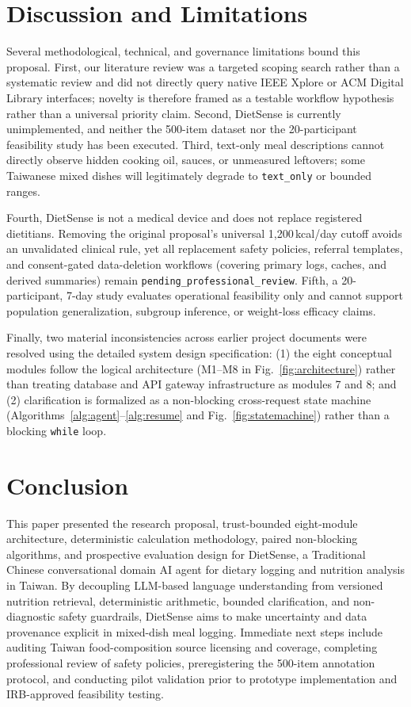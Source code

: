 \documentclass[conference]{IEEEtran}
\begin{document}
\section{Discussion and Limitations}
Several methodological, technical, and governance limitations bound this proposal. First, our literature review was a targeted scoping search rather than a systematic review and did not directly query native IEEE Xplore or ACM Digital Library interfaces; novelty is therefore framed as a testable workflow hypothesis rather than a universal priority claim. Second, DietSense is currently unimplemented, and neither the 500-item dataset nor the 20-participant feasibility study has been executed. Third, text-only meal descriptions cannot directly observe hidden cooking oil, sauces, or unmeasured leftovers; some Taiwanese mixed dishes will legitimately degrade to \texttt{text\_only} or bounded ranges.

Fourth, DietSense is not a medical device and does not replace registered dietitians. Removing the original proposal's universal 1,200\,kcal/day cutoff avoids an unvalidated clinical rule, yet all replacement safety policies, referral templates, and consent-gated data-deletion workflows (covering primary logs, caches, and derived summaries) remain \texttt{pending\_professional\_review}. Fifth, a 20-participant, 7-day study evaluates operational feasibility only and cannot support population generalization, subgroup inference, or weight-loss efficacy claims.

Finally, two material inconsistencies across earlier project documents were resolved using the detailed system design specification: (1) the eight conceptual modules follow the logical architecture (M1--M8 in Fig.~\ref{fig:architecture}) rather than treating database and API gateway infrastructure as modules 7 and 8; and (2) clarification is formalized as a non-blocking cross-request state machine (Algorithms~\ref{alg:agent}--\ref{alg:resume} and Fig.~\ref{fig:statemachine}) rather than a blocking \texttt{while} loop.

\section{Conclusion}
This paper presented the research proposal, trust-bounded eight-module architecture, deterministic calculation methodology, paired non-blocking algorithms, and prospective evaluation design for DietSense, a Traditional Chinese conversational domain AI agent for dietary logging and nutrition analysis in Taiwan. By decoupling LLM-based language understanding from versioned nutrition retrieval, deterministic arithmetic, bounded clarification, and non-diagnostic safety guardrails, DietSense aims to make uncertainty and data provenance explicit in mixed-dish meal logging. Immediate next steps include auditing Taiwan food-composition source licensing and coverage, completing professional review of safety policies, preregistering the 500-item annotation protocol, and conducting pilot validation prior to prototype implementation and IRB-approved feasibility testing.



\end{document}
